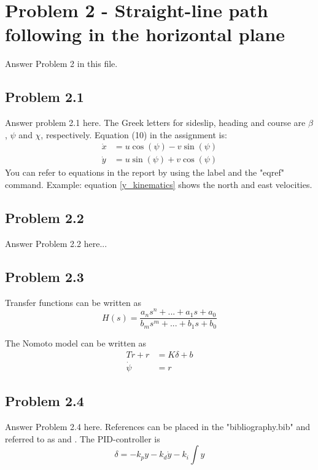 \section*{Problem 2 - Straight-line path following in the horizontal plane}
Answer Problem 2 in this file. 
\subsection*{Problem 2.1}
Answer problem 2.1 here. The Greek letters for sideslip, heading and course are $\beta$, $\psi$ and $\chi$, respectively. Equation (10) in the assignment is:
\begin{equation}
\label{y_kinematics}
	\begin{aligned}
		\dot{x} &= u \cos (\psi) -v \sin (\psi) \\
		\dot{y} &= u \sin (\psi) + v \cos (\psi)
	\end{aligned}
\end{equation} 
You can refer to equations in the report by using the label and the "eqref" command. Example: equation \eqref{y_kinematics} shows the north and east velocities. 

\subsection*{Problem 2.2}
Answer Problem 2.2 here...

\subsection*{Problem 2.3}
Transfer functions can be written as
\begin{equation}
	H(s) = \frac{a_n s^n + ... + a_1 s + a_0}{b_m s^m + ... + b_1 s + b_0}
\end{equation}

The Nomoto model can be written as
\begin{equation}
\label{eq:nomoto}
	\begin{aligned}
		T \dot{r} + r &= K \delta + b \\
		\dot{\psi} &= r
	\end{aligned}
\end{equation}

\subsection*{Problem 2.4}
Answer Problem 2.4 here.  References can be placed in the "bibliography.bib" and referred to as \cite{Fossen2011} and \cite{Fjellstad1994857}. The PID-controller is
\begin{equation}
	\delta = -k_p y - k_d \dot{y} - k_i \int y
\end{equation}
